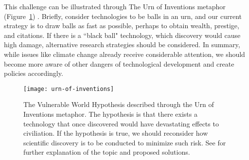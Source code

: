 This challenge can be illustrated through The Urn of Inventions metaphor (Figure~\ref{fig8:vwh}) \citep{bostrom2019}. %
Briefly, consider technologies to be balls in an urn, and our current strategy is to draw balls as fast as possible, perhaps to obtain wealth, prestige, and citations.
If there is a ``black ball" technology, which discovery would cause high damage, alternative research strategies should be considered.
In summary, while issues like climate change already receive considerable attention, we should become more aware of other dangers of technological development and create policies accordingly.


%

%

\begin{figure}[h]
  \centering
  \texttt{[image: urn-of-inventions]}
    \caption[The Vulnerable World Hypothesis]{The Vulnerable World Hypothesis described through the Urn of Inventions metaphor. The hypothesis is that there exists a technology that once discovered would have devastating effects to civiliation. If the hypothesis is true, we should reconsider how scientific discovery is to be conducted to minimize such risk. See \citep{bostrom2019} for further explanation of the topic and proposed solutions.}
    \label{fig8:vwh}
\end{figure}

